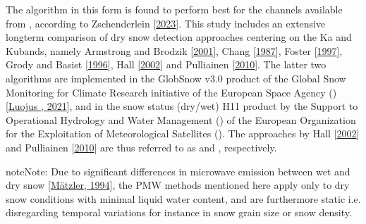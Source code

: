 \documentclass[letterpaper,10pt,english]{jupyterBook}
\begin{document}
\sphinxAtStartPar
The algorithm in this form is found to perform best for the channels available from {\hyperref[\detokenize{book/acronyms:term-CIMR}]{}}, according to Zschenderlein  {[}\hyperlink{cite.book/references:id18}{2023}{]}.
This study includes an extensive long\sphinxhyphen{}term comparison of {\hyperref[\detokenize{book/acronyms:term-PMW}]{}} dry snow detection approaches centering on the Ka and Ku\sphinxhyphen{}bands, namely Armstrong and Brodzik {[}\hyperlink{cite.book/references:id11}{2001}{]}, Chang  {[}\hyperlink{cite.book/references:id7}{1987}{]}, Foster  {[}\hyperlink{cite.book/references:id8}{1997}{]}, Grody and Basist {[}\hyperlink{cite.book/references:id9}{1996}{]}, Hall  {[}\hyperlink{cite.book/references:id2}{2002}{]} and Pulliainen  {[}\hyperlink{cite.book/references:id3}{2010}{]}.
The latter two algorithms are implemented in the GlobSnow v3.0 {\hyperref[\detokenize{book/acronyms:term-SWE}]{}} product of the Global Snow Monitoring for Climate Research initiative of the European Space Agency ({\hyperref[\detokenize{book/acronyms:term-ESA}]{}}) {[}\hyperlink{cite.book/references:id22}{Luojus , 2021}{]}, and in the snow status (dry/wet) H11 product by the Support to Operational Hydrology and Water Management ({\hyperref[\detokenize{book/acronyms:term-H-SAF}]{}}) of the European Organization for the Exploitation of Meteorological Satellites ({\hyperref[\detokenize{book/acronyms:term-EUMETSAT}]{}}).
The approaches by Hall  {[}\hyperlink{cite.book/references:id2}{2002}{]} and Pulliainen  {[}\hyperlink{cite.book/references:id3}{2010}{]} are thus referred to as  and , respectively.

\begin{sphinxadmonition}{note}{Note:}
\sphinxAtStartPar
Due to significant differences in microwave emission between wet and dry snow {[}\hyperlink{cite.book/references:id13}{Mätzler, 1994}{]}, the PMW methods mentioned here apply only to dry snow conditions with minimal liquid water content, and are furthermore static i.e. disregarding temporal variations for instance in snow grain size or snow density.
\end{sphinxadmonition}
\end{document}
